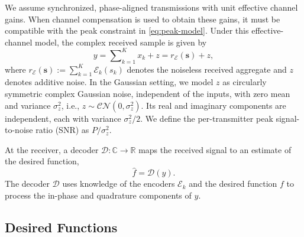 \documentclass[journal,12pt,onecolumn,draftclsnofoot]{IEEEtran}
\newcommand{\enc}{\mathscr{E}}\newcommand{\dec}{\mathscr{D}}\newcommand{\R}{\mathbb R}\newcommand{\C}{\mathbb C}
\begin{document}
We assume synchronized, phase-aligned transmissions with unit effective channel gains. When channel compensation is used to obtain these gains, it must be compatible with the peak constraint in \eqref{eq:peak-model}. Under this effective-channel model, the complex received sample is given by
\begin{equation}
 y=\sum\nolimits_{k=1}^Kx_k+z=r_\enc(\boldsymbol s)+z,
 \label{eq:mac-model}
\end{equation}
where $r_\enc(\boldsymbol s):=\sum_{k=1}^K\enc_k(s_k)$ denotes the noiseless received aggregate and $z$ denotes additive noise.  In the Gaussian setting, we model $z$ as circularly symmetric complex Gaussian noise, independent of the inputs, with zero mean and variance $\sigma_z^2$, i.e., $z\sim\mathcal{CN}(0,\sigma_z^2)$. Its real and imaginary components are independent, each with variance $\sigma_z^2/2$. We define the per-transmitter peak signal-to-noise ratio (SNR) as $P/\sigma_z^2$.


At the receiver, a decoder $\dec:\C\to\R$ maps the received signal to an estimate of the desired function,
$$\hat f=\dec(y).$$
The decoder $\dec$ uses knowledge of the encoders $\enc_k$ and the desired function $f$ to process the in-phase and quadrature components of $y$.  



\subsection{Desired Functions}
\end{document}
